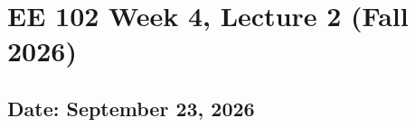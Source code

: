 \documentclass{ee102_notes}
\renewcommand{\releasedate}{September 23, 2026}
\begin{document}
\section*{EE 102 Week 4, Lecture 2 (Fall 2026)}
\subsection*{Date: \releasedate}
\tableofcontents

\end{document}
